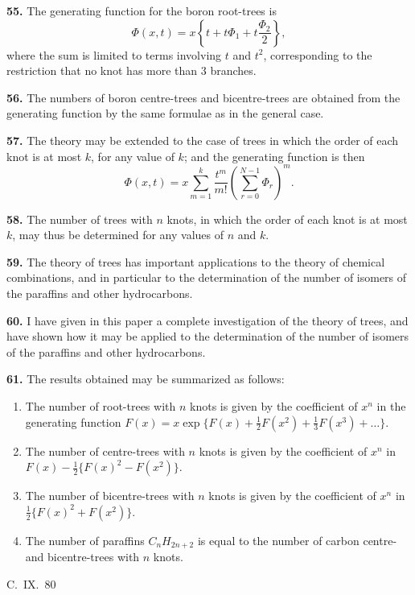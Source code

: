 \documentclass[11pt,a4paper]{article}
\begin{document}
{\medskip
\noindent\textbf{55.}
The generating function for the boron root-trees is
\[
\Phi(x,t) = x\left\{t + t\Phi_1 + t\frac{\Phi_2}{2}\right\},
\]
where the sum is limited to terms involving $t$ and $t^2$, corresponding to the restriction that no knot has more than 3 branches.

\medskip
\noindent\textbf{56.}
The numbers of boron centre-trees and bicentre-trees are obtained from the generating function by the same formulae as in the general case.

\medskip
\noindent\textbf{57.}
The theory may be extended to the case of trees in which the order of each knot is at most $k$, for any value of $k$; and the generating function is then
\[
\Phi(x,t) = x\sum_{m=1}^{k} \frac{t^m}{m!} \left(\sum_{r=0}^{N-1} \Phi_r\right)^m.
\]

\medskip
\noindent\textbf{58.}
The number of trees with $n$ knots, in which the order of each knot is at most $k$, may thus be determined for any values of $n$ and $k$.

\medskip
\noindent\textbf{59.}
The theory of trees has important applications to the theory of chemical combinations, and in particular to the determination of the number of isomers of the paraffins and other hydrocarbons.

\medskip
\noindent\textbf{60.}
I have given in this paper a complete investigation of the theory of trees, and have shown how it may be applied to the determination of the number of isomers of the paraffins and other hydrocarbons.

\medskip
\noindent\textbf{61.}
The results obtained may be summarized as follows:

\begin{enumerate}[label=\arabic*.]
\item The number of root-trees with $n$ knots is given by the coefficient of $x^n$ in the generating function $F(x) = x \exp\{F(x) + \frac{1}{2}F(x^2) + \frac{1}{3}F(x^3) + \ldots\}$.
\item The number of centre-trees with $n$ knots is given by the coefficient of $x^n$ in $F(x) - \frac{1}{2}\{F(x)^2 - F(x^2)\}$.
\item The number of bicentre-trees with $n$ knots is given by the coefficient of $x^n$ in $\frac{1}{2}\{F(x)^2 + F(x^2)\}$.
\item The number of paraffins $C_nH_{2n+2}$ is equal to the number of carbon centre- and bicentre-trees with $n$ knots.
\end{enumerate}
\hfill C.~IX.\ 80

}
\end{document}
